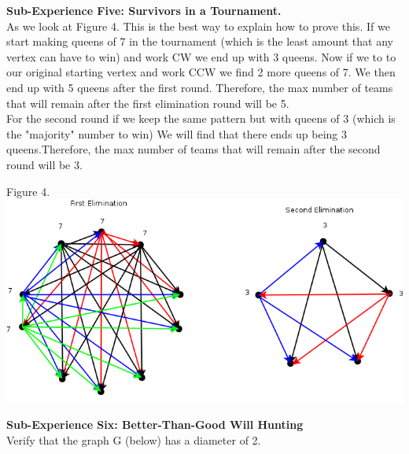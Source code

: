 \documentclass[10pt,a4paper]{report}
\begin{document}
		\begin{center}
	
		\end{center}
	\textbf{Sub-Experience Five: Survivors in a Tournament.}\\
		As we look at Figure 4. This is the best way to explain how to prove this.  If we start making queens of 7 in the tournament (which is the least amount that any vertex can have to win) and work CW we end up with 3 queens. Now if we to to our original starting vertex and work CCW we find 2 more queens of 7.  We then end up with 5 queens after the first round.  Therefore, the max number of teams that will remain after the first elimination round will be 5.\\
		\newline
		For the second round if we keep the same pattern but with queens of 3 (which is the "majority" number to win) We will find that there ends up being 3 queens.Therefore, the max number of teams that will remain after the second round will be 3.\\
		\begin{center}
			Figure 4.\\
			\includegraphics[scale=.5]{e5.png}
			\newline
			\newline
		\end{center}
	\textbf{Sub-Experience Six: Better-Than-Good Will Hunting}\\
		Verify that the graph G (below) has a diameter of 2.\\
		
\end{document}
